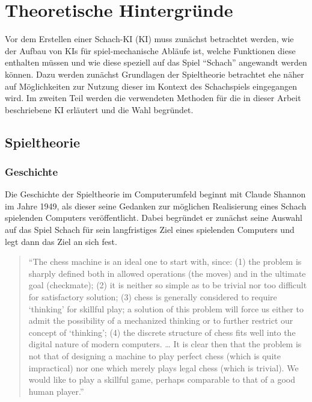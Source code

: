 \chapter{Theoretische Hintergründe}

Vor dem Erstellen einer Schach-\acs{KI} (\acl{KI}) muss zunächst betrachtet werden, wie der Aufbau von KIs für spiel-mechanische Abläufe ist, welche Funktionen diese enthalten müssen und wie diese speziell auf das Spiel ``Schach'' angewandt werden können. Dazu werden zunächst Grundlagen der Spieltheorie betrachtet ehe näher auf Möglichkeiten zur Nutzung dieser im Kontext des Schachspiels eingegangen wird. Im zweiten Teil werden die verwendeten Methoden für die in dieser Arbeit beschriebene KI erläutert und die Wahl begründet.

\section{Spieltheorie}

\subsection{Geschichte}

Die Geschichte der Spieltheorie im Computerumfeld beginnt mit Claude Shannon im Jahre 1949, als dieser seine Gedanken zur möglichen Realisierung eines Schach spielenden Computers veröffentlicht. Dabei begründet er zunächst seine Auswahl auf das Spiel Schach für sein langfristiges Ziel eines spielenden Computers und legt dann das Ziel an sich fest.

\begin{quote}
“The chess machine is an ideal one to start with, since: (1) the problem is sharply defined both in allowed operations (the moves) and in the ultimate goal (checkmate); (2) it is neither so simple as to be trivial nor too difficult for satisfactory solution; (3) chess is generally considered to require ‘thinking’ for skillful play; a solution of this problem will force us either to admit the possibility of a mechanized thinking or to further restrict our concept of ‘thinking’; (4) the discrete structure of chess fits well into the digital nature of modern computers. … It is clear then that the problem is not that of designing a machine to play perfect chess (which is quite impractical) nor one which merely plays legal chess (which is trivial). We would like to play a skillful game, perhaps comparable to that of a good human player.”
\end{quote}

